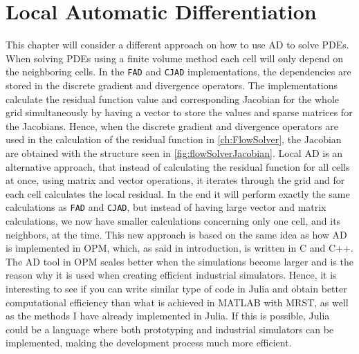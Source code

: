 \chapter{Local Automatic Differentiation}
\label{ch:LocalAD}
This chapter will consider a different approach on how to use AD to solve PDEs. When solving PDEs using a finite volume method each cell will only depend on the neighboring cells. In the \texttt{FAD} and \texttt{CJAD} implementations, the dependencies are stored in the discrete gradient and divergence operators. The implementations calculate the residual function value and corresponding Jacobian for the whole grid simultaneously by having a vector to store the values and sparse matrices for the Jacobians. Hence, when the discrete gradient and divergence operators are used in the calculation of the residual function in \autoref{ch:FlowSolver}, the Jacobian are obtained with the structure seen in \autoref{fig:flowSolverJacobian}. Local AD is an alternative approach, that instead of calculating the residual function for all cells at once, using matrix and vector operations, it iterates through the grid and for each cell calculates the local residual. In the end it will perform exactly the same calculations as \texttt{FAD} and \texttt{CJAD}, but instead of having large vector and matrix calculations, we now have smaller calculations concerning only one cell, and its neighbors, at the time. This new approach is based on the same idea as how AD is implemented in OPM, which, as said in introduction, is written in C and C++. The AD tool in OPM scales better when the simulations become larger and is the reason why it is used when creating efficient industrial simulators. Hence, it is interesting to see if you can write similar type of code in Julia and obtain better computational efficiency than what is achieved in MATLAB with MRST, as well as the methods I have already implemented in Julia. If this is possible, Julia could be a language where both prototyping and industrial simulators can be implemented, making the development process much more efficient. 

